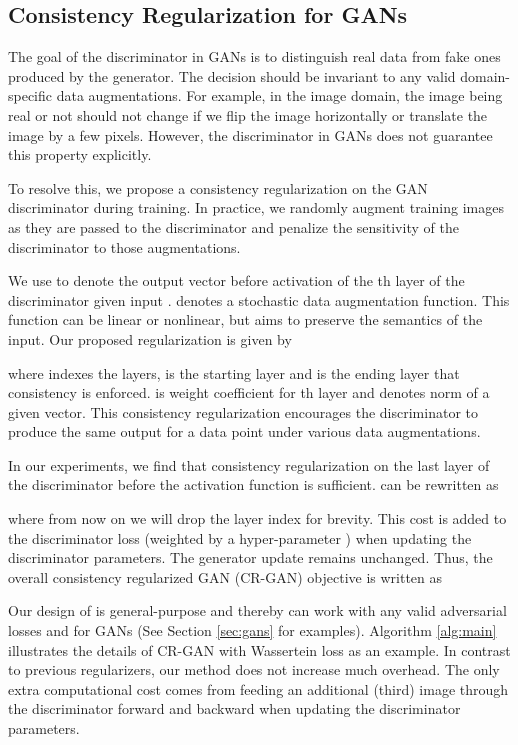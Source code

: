 \documentclass{article} \usepackage{iclr2020_conference,times}
\begin{document}
\subsection{Consistency Regularization for GANs}
The goal of the discriminator in GANs is to distinguish real data from fake ones produced by the generator. The decision should be invariant to any valid domain-specific data augmentations. For example, in the image domain, the image being real or not should not change if we flip the image horizontally or translate the image by a few pixels. However, the discriminator in GANs does not guarantee this property explicitly. 

To resolve this, we propose a consistency regularization on the GAN discriminator during
training.
In practice, we randomly augment training images as they are passed to 
the discriminator and penalize the sensitivity of the discriminator to those augmentations.

We use  to denote the output vector before activation of the th layer of the discriminator
given input . 
 denotes a stochastic data augmentation function. 
This function can be linear or nonlinear, but aims to preserve the 
semantics of the input. 
Our proposed regularization is given by

where  indexes the layers,  is the starting layer and  is the ending layer that consistency is enforced.
 is weight coefficient for th layer and   denotes  norm of a given vector. 
This consistency regularization encourages the discriminator to produce the same output for a data point under various data augmentations.

In our experiments, we find that consistency regularization on the last layer of the discriminator before the activation function is sufficient.  can be rewritten as

where from now on we will drop the layer index for brevity. 
This cost is added to the discriminator loss (weighted by a hyper-parameter ) when updating the discriminator parameters.
The generator update remains unchanged.
Thus, the overall consistency regularized GAN (CR-GAN) objective is written as

Our design of  is general-purpose and thereby can work with any valid adversarial losses  and  for GANs (See Section \ref{sec:gans} for examples). 
Algorithm \ref{alg:main} illustrates the details of CR-GAN with Wassertein loss as an example. In contrast to previous regularizers, our method does not increase much overhead. The only extra computational cost comes from feeding an additional (third) image through the discriminator forward and backward when updating the discriminator
parameters.
\end{document}

